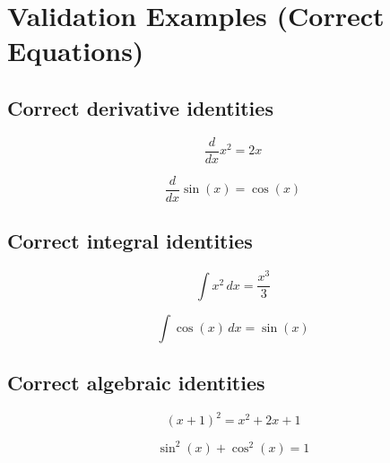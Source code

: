 \documentclass{article}
\begin{document}

\section*{Validation Examples (Correct Equations)}

\subsection*{Correct derivative identities}
\begin{equation}
\frac{d}{dx} x^2 = 2x
\end{equation}

\begin{equation}
\frac{d}{dx} \sin(x) = \cos(x)
\end{equation}

\subsection*{Correct integral identities}
\begin{equation}
\int x^2\,dx = \frac{x^3}{3}
\end{equation}

\begin{equation}
\int \cos(x)\,dx = \sin(x)
\end{equation}

\subsection*{Correct algebraic identities}
\begin{equation}
(x+1)^2 = x^2 + 2x + 1
\end{equation}

\begin{equation}
\sin^2(x) + \cos^2(x) = 1
\end{equation}
\end{document}

